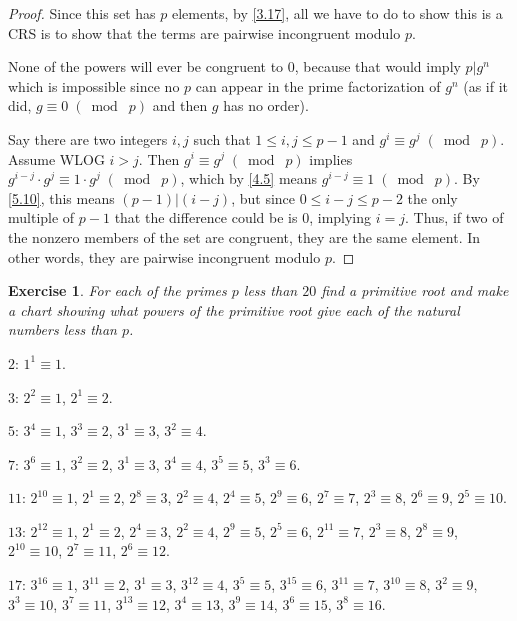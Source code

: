 \documentclass{article}
\newtheorem{ex}[thm]{Exercise}
\numberwithin{equation}{thm}
\providecommand{\gmod}[1]{\; (\bmod \; #1)}
\begin{document}
\begin{proof}
  Since this set has $p$ elements, by \ref{3.17}, all we have to do to show this is a CRS is to show that the terms are pairwise incongruent modulo $p$.

  None of the powers will ever be congruent to $0$, because that would imply $p | g^n$ which is impossible since no $p$ can appear in the prime factorization of $g^n$ (as if it did, $g \equiv 0 \gmod p$ and then $g$ has no order).

  Say there are two integers $i, j$ such that $1 \leq i, j \leq p-1$ and $g^i \equiv g^j \gmod p$. Assume WLOG $i > j$. Then $g^i \equiv g^j \gmod p$ implies $g^{i-j} \cdot g^j \equiv 1 \cdot g^j \gmod p$, which by \ref{4.5} means $g^{i-j} \equiv 1 \gmod p$.
  By \ref{5.10}, this means $(p-1) | (i - j)$, but since $0 \leq i - j \leq p-2$ the only multiple of $p-1$ that the difference could be is $0$, implying $i = j$. Thus, if two of the nonzero members of the set are congruent, they are the same element. In other words, they are pairwise incongruent modulo $p$.
\end{proof}



\begin{ex} \label{6.7}
  For each of the primes $p$ less than $20$ find a primitive root and make a chart showing what powers of the primitive root give each of the natural numbers less than $p$.
\end{ex}

$2$: $1^1 \equiv 1$.

$3$: $2^2 \equiv 1$, $2^1 \equiv 2$.

$5$: $3^4 \equiv 1$, $3^3 \equiv 2$, $3^1 \equiv 3$, $3^2 \equiv 4$.

$7$: $3^6 \equiv 1$, $3^2 \equiv 2$, $3^1 \equiv 3$, $3^4 \equiv 4$, $3^5 \equiv 5$, $3^3 \equiv 6$.

$11$: $2^{10} \equiv 1$, $2^1 \equiv 2$, $2^8 \equiv 3$, $2^2 \equiv 4$, $2^4 \equiv 5$, $2^9 \equiv 6$, $2^7 \equiv 7$, $2^3 \equiv 8$,
$2^6 \equiv 9$, $2^5 \equiv 10$.

$13$: $2^{12} \equiv 1$, $2^1 \equiv 2$, $2^4 \equiv 3$, $2^2 \equiv 4$, $2^9 \equiv 5$, $2^5 \equiv 6$, $2^{11} \equiv 7$, $2^3 \equiv 8$,
$2^8 \equiv 9$, $2^{10} \equiv 10$, $2^7 \equiv 11$, $2^6 \equiv 12$.

$17$: $3^{16} \equiv 1$, $3^{11} \equiv 2$, $3^1 \equiv 3$, $3^{12} \equiv 4$, $3^5 \equiv 5$, $3^{15} \equiv 6$, $3^{11} \equiv 7$, $3^{10} \equiv 8$,
$3^2 \equiv 9$, $3^3 \equiv 10$, $3^7 \equiv 11$, $3^{13} \equiv 12$, $3^4 \equiv 13$, $3^9 \equiv 14$, $3^6 \equiv 15$, $3^8 \equiv 16$.
\end{document}
